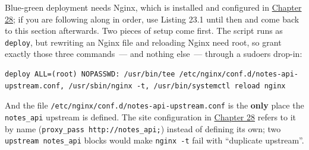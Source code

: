 Blue-green deployment needs Nginx, which is installed and configured in \hyperref[ch:28-traffic-routing]{Chapter 28}; if you are following along in order, use Listing 23.1 until then and come back to this section afterwards. Two pieces of setup come first. The script runs as \texttt{deploy}, but rewriting an Nginx file and reloading Nginx need root, so grant exactly those three commands~--- and nothing else~--- through a sudoers drop-in:

\begin{codebox}[short]

\begin{Shaded}
\begin{Highlighting}[]
\end{Highlighting}
\end{Shaded}

\end{codebox}

\begin{outputbox}[short]
\begin{Verbatim}[fontsize=\codesize, breaklines, breakanywhere, breaksymbolleft={\tiny\textcolor{muted}{$\hookrightarrow$}}]
deploy ALL=(root) NOPASSWD: /usr/bin/tee /etc/nginx/conf.d/notes-api-upstream.conf, /usr/sbin/nginx -t, /usr/bin/systemctl reload nginx
\end{Verbatim}
\end{outputbox}

\noindent{}And the file \texttt{/}\allowbreak{}\texttt{etc/}\allowbreak{}\texttt{nginx/}\allowbreak{}\texttt{conf.}\allowbreak{}\texttt{d/}\allowbreak{}\texttt{notes-}\allowbreak{}\texttt{api-}\allowbreak{}\texttt{upstream.}\allowbreak{}\texttt{conf} is the \textbf{only} place the \texttt{notes\_api} upstream is defined. The site configuration in \hyperref[ch:28-traffic-routing]{Chapter 28} refers to it by name (\texttt{proxy\_}\allowbreak{}\texttt{pass\ http:}\allowbreak{}\texttt{/}\allowbreak{}\texttt{/}\allowbreak{}\texttt{notes\_}\allowbreak{}\texttt{api;}) instead of defining its own; two \texttt{upstream\ notes\_api} blocks would make \texttt{nginx\ -t} fail with ``duplicate upstream''.

